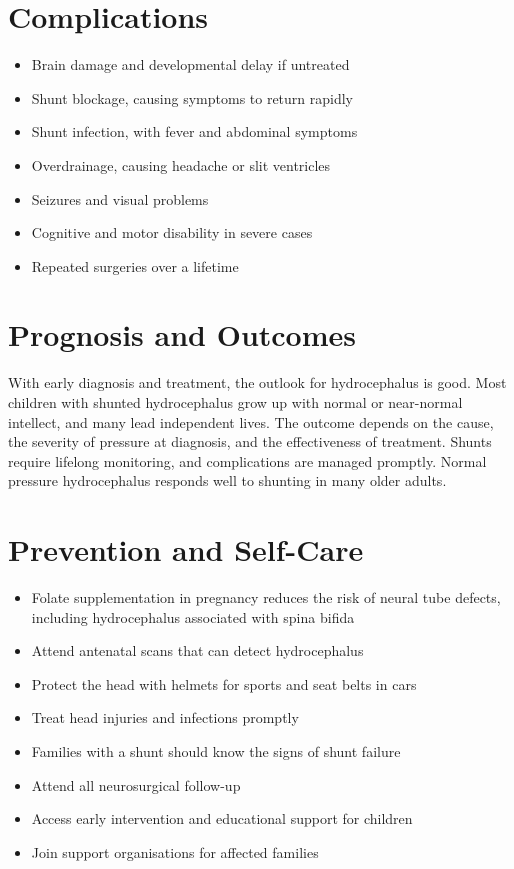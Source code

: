 \section*{Complications}
\begin{itemize}
    \item Brain damage and developmental delay if untreated
    \item Shunt blockage, causing symptoms to return rapidly
    \item Shunt infection, with fever and abdominal symptoms
    \item Overdrainage, causing headache or slit ventricles
    \item Seizures and visual problems
    \item Cognitive and motor disability in severe cases
    \item Repeated surgeries over a lifetime
\end{itemize}

\section*{Prognosis and Outcomes}
With early diagnosis and treatment, the outlook for hydrocephalus is good. Most children with shunted hydrocephalus grow up with normal or near-normal intellect, and many lead independent lives. The outcome depends on the cause, the severity of pressure at diagnosis, and the effectiveness of treatment. Shunts require lifelong monitoring, and complications are managed promptly. Normal pressure hydrocephalus responds well to shunting in many older adults.

\section*{Prevention and Self-Care}
\begin{itemize}
    \item Folate supplementation in pregnancy reduces the risk of neural tube defects, including hydrocephalus associated with spina bifida
    \item Attend antenatal scans that can detect hydrocephalus
    \item Protect the head with helmets for sports and seat belts in cars
    \item Treat head injuries and infections promptly
    \item Families with a shunt should know the signs of shunt failure
    \item Attend all neurosurgical follow-up
    \item Access early intervention and educational support for children
    \item Join support organisations for affected families
\end{itemize}

